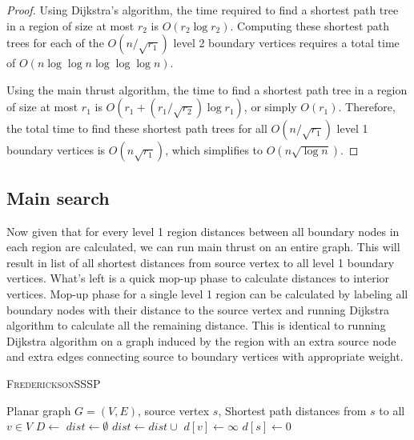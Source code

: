 \begin{proof}
Using Dijkstra's algorithm, the time required to find a shortest path tree in a region of size at most $r_2$ is $O(r_2 \log r_2)$. Computing these shortest path trees for each of the $O(n / \sqrt{r_1})$ level 2 boundary vertices requires a total time of $O(n \log \log n \log \log \log n)$.

Using the main thrust algorithm, the time to find a shortest path tree in a region of size at most $r_1$ is $O(r_1 + (r_1 /\sqrt{r_2})\log r_1)$, or simply $O(r_1)$. Therefore, the total time to find these shortest path trees for all $O(n /\sqrt{r_1})$ level 1 boundary vertices is $O(n \sqrt{r_1})$, which simplifies to $O(n\sqrt{\log n})$.
\end{proof}

\subsection{Main search}

Now given that for every level 1 region distances between all boundary nodes in each region are calculated, we can run main thrust on an entire graph. This will result in list of all shortest distances from source vertex to all level 1 boundary vertices. What's left is a quick mop-up phase to calculate distances to interior vertices. Mop-up phase for a single level 1 region can be calculated by labeling all boundary nodes with their distance to the source vertex and running Dijkstra algorithm to calculate all the remaining distance. This is identical to running Dijkstra algorithm on a graph induced by the region with an extra source node and extra edges connecting source to boundary vertices with appropriate weight.

\begin{algorithm}[H]
\caption{\textsc{FredericksonSSSP}}\label{FredericksonSSSP}
\begin{algorithmic}[1]
\Require Planar graph $G = (V,E)$, source vertex $s$, 
\Ensure Shortest path distances from $s$ to all $v \in V$
\State $D \gets$ 
\State $dist \gets \emptyset$
    \State $dist \gets dist \cup$
\EndFor
{}
    \State $d[v] \gets \infty$
\EndFor
\State $d[s] \gets 0$
\State {}
\State {}
\State {}
\end{algorithmic}
\end{algorithm}


